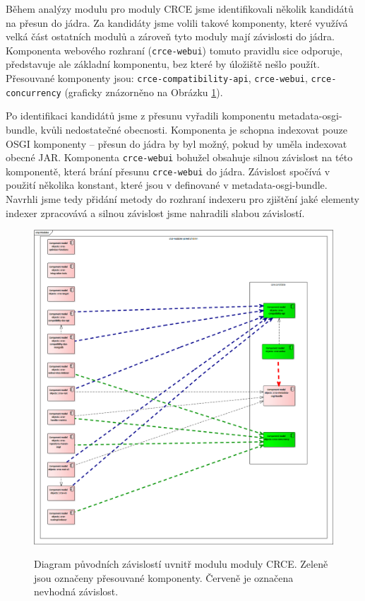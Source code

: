 \documentclass[12pt, a4paper]{article}
\begin{document}
Během analýzy modulu pro moduly CRCE jsme identifikovali několik kandidátů na přesun do jádra. Za kandidáty jsme volili takové komponenty, které využívá velká část ostatních modulů a zároveň tyto moduly mají závislosti do jádra. Komponenta webového rozhraní (\texttt{crce-webui}) tomuto pravidlu sice odporuje, představuje ale základní komponentu, bez které by úložiště nešlo použít. Přesouvané komponenty jsou: \texttt{crce-compatibility-api}, \texttt{crce-webui}, \texttt{crce-concurrency} (graficky znázorněno na Obrázku \ref{fig:modulesCRCE}). 

Po identifikaci kandidátů jsme z přesunu vyřadili komponentu metadata-osgi-bundle, kvůli nedostatečné obecnosti. Komponenta je schopna indexovat pouze OSGI komponenty -- přesun do jádra by byl možný, pokud by uměla indexovat obecné JAR. Komponenta \texttt{crce-webui} bohužel obsahuje silnou závislost na této komponentě, která brání přesunu \texttt{crce-webui} do jádra. Závislost spočívá v použití několika konstant, které jsou v definované v metadata-osgi-bundle. Navrhli jsme tedy přidání metody do rozhraní indexeru pro zjištění jaké elementy indexer zpracovává a silnou závislost jsme nahradili slabou závislostí.

\begin{figure}[h!]
\centering
\includegraphics[width=135mm]{modules.png}
\label{fig:modulesCRCE}
\caption{Diagram původních závislostí uvnitř modulu moduly CRCE. Zeleně jsou označeny přesouvané komponenty. Červeně je označena nevhodná závislost.}
\end{figure}
\end{document}
